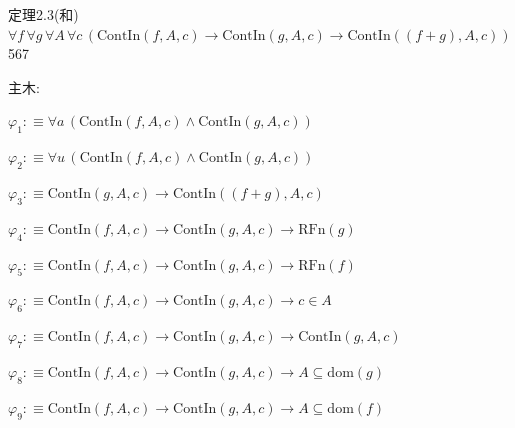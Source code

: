 \begin{fullproof}{定理2.3(和)}{$\forall f\,\forall g\,\forall A\,\forall c\,(\mathrm{ContIn}(f,A,c) \to \mathrm{ContIn}(g,A,c) \to \mathrm{ContIn}((f + g),A,c))$}{567}
\begin{ptree}
\noLine
{}
\end{ptree}
\noindent 主木:
\begin{ptree}
\noLine
{}
\noLine
{}
\end{ptree}
\begin{abbrevlist}
\item $\varphi_{1} :\equiv \forall a\,(\mathrm{ContIn}(f,A,c) \land \mathrm{ContIn}(g,A,c))$
\item $\varphi_{2} :\equiv \forall u\,(\mathrm{ContIn}(f,A,c) \land \mathrm{ContIn}(g,A,c))$
\item $\varphi_{3} :\equiv \mathrm{ContIn}(g,A,c) \to \mathrm{ContIn}((f + g),A,c)$
\item $\varphi_{4} :\equiv \mathrm{ContIn}(f,A,c) \to \mathrm{ContIn}(g,A,c) \to \mathrm{RFn}(g)$
\item $\varphi_{5} :\equiv \mathrm{ContIn}(f,A,c) \to \mathrm{ContIn}(g,A,c) \to \mathrm{RFn}(f)$
\item $\varphi_{6} :\equiv \mathrm{ContIn}(f,A,c) \to \mathrm{ContIn}(g,A,c) \to c \in A$
\item $\varphi_{7} :\equiv \mathrm{ContIn}(f,A,c) \to \mathrm{ContIn}(g,A,c) \to \mathrm{ContIn}(g,A,c)$
\item $\varphi_{8} :\equiv \mathrm{ContIn}(f,A,c) \to \mathrm{ContIn}(g,A,c) \to A \subseteq \mathrm{dom}(g)$
\item $\varphi_{9} :\equiv \mathrm{ContIn}(f,A,c) \to \mathrm{ContIn}(g,A,c) \to A \subseteq \mathrm{dom}(f)$

\end{abbrevlist}
\end{fullproof}
